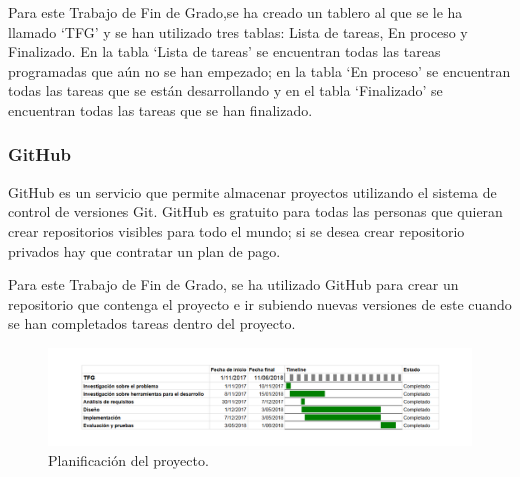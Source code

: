 Para este Trabajo de Fin de Grado,se ha creado un tablero al que se le ha llamado \enquote*{TFG} y se han utilizado tres tablas: Lista de tareas, En proceso y Finalizado. En la tabla \enquote*{Lista de tareas} se encuentran todas las tareas programadas que aún no se han empezado; en la tabla \enquote*{En proceso} se encuentran todas las tareas que se están desarrollando y en el tabla \enquote*{Finalizado} se encuentran todas las tareas que se han finalizado.
\subsubsection{GitHub}
GitHub \cite{github} es un servicio que permite almacenar proyectos utilizando el sistema de control de versiones Git. GitHub es gratuito para todas las personas que quieran crear repositorios visibles para todo el mundo; si se desea crear repositorio privados hay que contratar un plan de pago.\newline

Para este Trabajo de Fin de Grado, se ha utilizado GitHub para crear un repositorio que contenga el proyecto e ir subiendo nuevas versiones de este cuando se han completados tareas dentro del proyecto.\newline
\newpage
\begin{figure}[H]
	\centering
	\includegraphics[scale=0.55,angle=90]{imagenes/Gantt.png}
	\caption{Planificación del proyecto.}
	\label{fig:gantt}
\end{figure}
